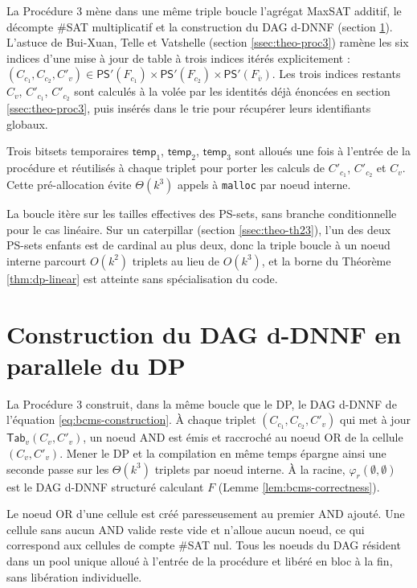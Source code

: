 \documentclass[11pt,a4paper]{report}
\theoremstyle{plain}
\theoremstyle{definition}
\begin{document}
La Procédure 3 mène dans une même triple boucle l'agrégat MaxSAT
additif, le décompte \#SAT multiplicatif et la construction du DAG
d-DNNF (section \ref{sec:impl-dag}). L'astuce de Bui-Xuan, Telle et
Vatshelle (section \ref{ssec:theo-proc3}) ramène les six indices
d'une mise à jour de table à trois indices itérés explicitement :
$(C_{c_1}, C_{c_2}, C'_v) \in \mathsf{PS}'(F_{c_1}) \times
\mathsf{PS}'(F_{c_2}) \times \mathsf{PS}'(F_{\overline{v}})$. Les
trois indices restants $C_v$, $C'_{c_1}$, $C'_{c_2}$ sont calculés à
la volée par les identités déjà énoncées en
section \ref{ssec:theo-proc3}, puis insérés dans le trie pour
récupérer leurs identifiants globaux.

Trois bitsets temporaires $\mathsf{temp}_1$, $\mathsf{temp}_2$,
$\mathsf{temp}_3$ sont alloués une fois à l'entrée de la procédure et
réutilisés à chaque triplet pour porter les calculs de $C'_{c_1}$,
$C'_{c_2}$ et $C_v$. Cette pré-allocation évite $\Theta(k^3)$ appels
à \texttt{malloc} par noeud interne.

La boucle itère sur les tailles effectives des PS-sets, sans branche
conditionnelle pour le cas linéaire. Sur un caterpillar
(section \ref{ssec:theo-th23}), l'un des deux PS-sets enfants est de
cardinal au plus deux, donc la triple boucle à un noeud interne
parcourt $O(k^2)$ triplets au lieu de $O(k^3)$, et la borne du
Théorème \ref{thm:dp-linear} est atteinte sans spécialisation du
code.

\section{Construction du DAG d-DNNF en parallele du DP}
\label{sec:impl-dag}

La Procédure 3 construit, dans la même boucle que le DP, le DAG
d-DNNF de l'équation \eqref{eq:bcms-construction}. À chaque triplet
$(C_{c_1}, C_{c_2}, C'_v)$ qui met à jour $\mathsf{Tab}_v(C_v, C'_v)$,
un noeud AND est émis et raccroché au noeud OR de la cellule
$(C_v, C'_v)$. Mener le DP et la compilation en même temps épargne
ainsi une seconde passe sur les $\Theta(k^3)$ triplets par noeud
interne. À la racine, $\varphi_r(\emptyset, \emptyset)$ est le DAG
d-DNNF structuré calculant $F$ (Lemme \ref{lem:bcms-correctness}).

Le noeud OR d'une cellule est créé paresseusement au premier AND
ajouté. Une cellule sans aucun AND valide reste vide et n'alloue
aucun noeud, ce qui correspond aux cellules de compte \#SAT nul.
Tous les noeuds du DAG résident dans un pool unique alloué à l'entrée
de la procédure et libéré en bloc à la fin, sans libération
individuelle.
\end{document}
